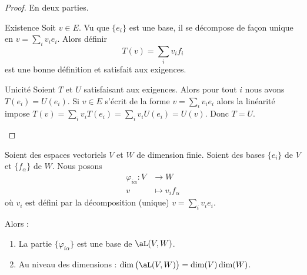 \begin{proof}
    En deux parties.\begin{subproof}
        \item[Existence]
            Soit \( v\in E\). Vu que \( \{ e_i \}\) est une base, il se décompose de façon unique en \( v=\sum_iv_ie_i\). Alors définir
            \begin{equation}
                T(v)=\sum_iv_if_i
            \end{equation}
            est une bonne définition et satisfait aux exigences.
        \item[Unicité]
            Soient \( T\) et \( U\) satisfaisant aux exigences. Alors pour tout \( i\) nous avons \( T(e_i)=U(e_i)\). Si \( v\in E\) s'écrit de la forme \( v=\sum_iv_ie_i\) alors la linéarité impose \( T(v)=\sum_iv_iT(e_i)=\sum_iv_iU(e_i)=U(v)\). Donc \( T = U\).
    \end{subproof}
\end{proof}

\begin{lemma}       \label{LEMooJXFIooKDzRWR}
    Soient des espaces vectoriels \( V\) et \( W\) de dimension finie. Soient des bases \( \{e_i\}\) de \( V\) et \( \{f_{\alpha}\}\) de \( W\). Nous posons
    \begin{equation}
        \begin{aligned}
            \varphi_{i\alpha}\colon V&\to W \\
            v&\mapsto v_if_{\alpha} 
        \end{aligned}
    \end{equation}
    où \( v_i\) est défini par la décomposition (unique) \( v=\sum_iv_ie_i\). 

    Alors :
    \begin{enumerate}
        \item
            La partie \( \{\varphi_{i\alpha}\} \) est une base de \( \aL(V,W)\).
        \item       \label{ITEMooPMLWooNbTyJI}
            Au niveau des dimensions : \( \dim\big( \aL(V,W) \big)=\dim(V)\dim(W)\).
    \end{enumerate}
\end{lemma}

